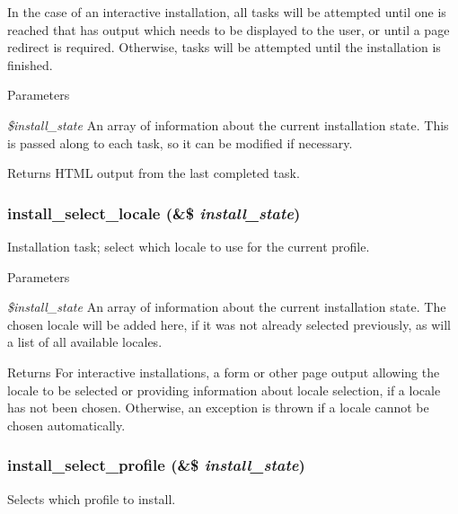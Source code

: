 In the case of an interactive installation, all tasks will be attempted until one is reached that has output which needs to be displayed to the user, or until a page redirect is required. Otherwise, tasks will be attempted until the installation is finished.


\begin{DoxyParams}{Parameters}
\item[{\em \$install\_\-state}]An array of information about the current installation state. This is passed along to each task, so it can be modified if necessary.\end{DoxyParams}
\begin{DoxyReturn}{Returns}
HTML output from the last completed task. 
\end{DoxyReturn}
\hypertarget{install_8core_8inc_accf7b9346a3fc1ac88bb8787addc41f5}{
\subsubsection[{install\_\-select\_\-locale}]{\setlength{\rightskip}{0pt plus 5cm}install\_\-select\_\-locale (\&\$ {\em install\_\-state})}}
\label{install_8core_8inc_accf7b9346a3fc1ac88bb8787addc41f5}
Installation task; select which locale to use for the current profile.


\begin{DoxyParams}{Parameters}
\item[{\em \$install\_\-state}]An array of information about the current installation state. The chosen locale will be added here, if it was not already selected previously, as will a list of all available locales.\end{DoxyParams}
\begin{DoxyReturn}{Returns}
For interactive installations, a form or other page output allowing the locale to be selected or providing information about locale selection, if a locale has not been chosen. Otherwise, an exception is thrown if a locale cannot be chosen automatically. 
\end{DoxyReturn}
\hypertarget{install_8core_8inc_a4fdd2e2671bc0dd16717b898a7e25cbc}{
\subsubsection[{install\_\-select\_\-profile}]{\setlength{\rightskip}{0pt plus 5cm}install\_\-select\_\-profile (\&\$ {\em install\_\-state})}}
\label{install_8core_8inc_a4fdd2e2671bc0dd16717b898a7e25cbc}
Selects which profile to install.


